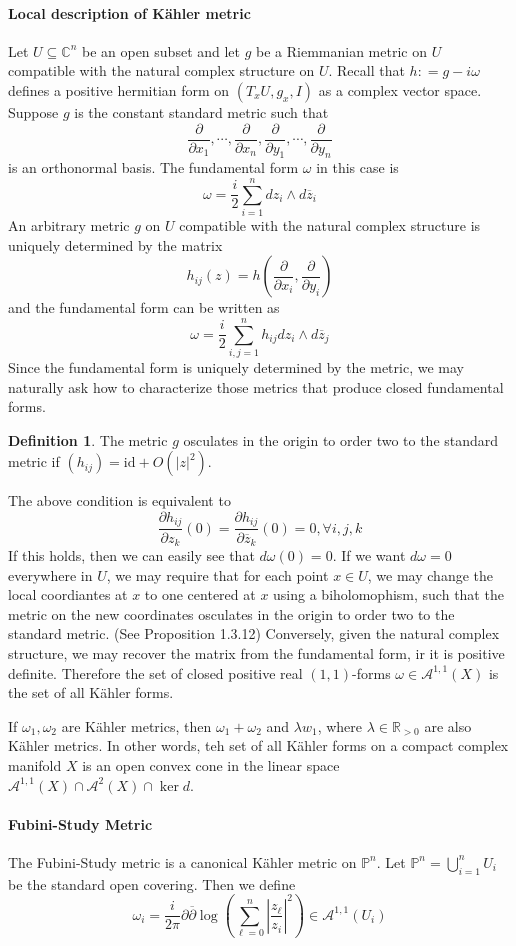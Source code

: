 \documentclass[12pt]{article}
\theoremstyle{plain}
\theoremstyle{definition}
\newtheorem{definition}[equation]{Definition}
\newcommand{\IC}{\mathbb{C}}
\newcommand{\IP}{\mathbb{P}}
\newcommand{\IR}{\mathbb{R}}
\newcommand\union{\bigcup}
\newcommand{\<}{\langle}
\renewcommand{\>}{\rangle}
\newcommand{\p}{\partial}
\newcommand{\w}{\omega}
\newcommand{\id}{\mathrm{id}}
\newcommand{\bz}{\overline{z}}
\newcommand{\bp}{\overline{\p}}
\newcommand{\sA}{\mathcal{A}}
\begin{document}
\paragraph{Local description of K{\"a}hler metric}
Let $U \subseteq \IC^n$ be an open subset and let $g$ be a Riemmanian metric on $U$ compatible with the natural complex structure on $U$. Recall that $h : = g - i \w$ defines a positive hermitian form on $(T_x U, g_x, I)$ as a complex vector space. Suppose $g$ is the constant standard metric such that 
$$ \frac{\p}{\p x_1}, \cdots, \frac{\p}{\p x_n}, \frac{\p}{\p y_1}, \cdots, \frac{\p}{\p y_n} $$
is an orthonormal basis. The fundamental form $\w$ in this case is 
$$ \w = \frac{i}{2} \sum_{i = 1}^n dz_i \wedge d \bz_i $$
An arbitrary metric $g$ on $U$ compatible with the natural complex structure is uniquely determined by the matrix 
$$ h_{ij}(z) = h(\frac{\p}{\p x_i}, \frac{\p}{\p y_i}) $$
and the fundamental form can be written as 
$$ \w = \frac{i}{2} \sum_{i, j = 1}^n h_{ij} dz_i \wedge d\bz_j $$
Since the fundamental form is uniquely determined by the metric, we may naturally ask how to characterize those metrics that produce closed fundamental forms. 
\begin{definition}
The metric $g$ osculates in the origin to order two to the standard metric if $(h_{ij}) = \id + O(|z|^2)$. 
\end{definition}
The above condition is equivalent to 
$$ \frac{\p h_{ij}}{\p z_k}(0) = \frac{\p h_{ij}}{\p \bz_k}(0) = 0, \forall i, j, k $$
If this holds, then we can easily see that $d \w (0) = 0$. If we want $d \w = 0$ everywhere in $U$, we may require that for each point $x \in U$, we may change the local coordiantes at $x$ to one centered at $x$ using a biholomophism, such that the metric on the new coordinates osculates in the origin to order two to the standard metric. (See Proposition 1.3.12)
Conversely, given the natural complex structure, we may recover the matrix from the fundamental form, ir it is positive definite. Therefore the set of closed positive real $(1, 1)$-forms $\w \in \sA^{1, 1}(X)$ is the set of all K{\"a}hler forms. 

If $\w_1, \w_2$ are K{\"a}hler metrics, then $\w_1 + \w_2$ and $\lambda w_1$, where $\lambda \in \IR_{> 0}$ are also K{\"a}hler metrics. In other words, teh set of all K{\"a}hler forms on a compact complex manifold $X$ is an open convex cone in the linear space $\sA^{1, 1}(X) \cap \sA^2(X) \cap \ker d$. 


\paragraph{Fubini-Study Metric}
The Fubini-Study metric is a canonical K{\"a}hler metric on $\IP^n$. Let $\IP^n = \union_{i = 1}^n U_i$ be the standard open covering. Then we define 
$$ \w_i = \frac{i}{2 \pi} \p \bp \log(\sum_{\ell = 0}^n |\frac{z_\ell}{z_i}|^2) \in \sA^{1, 1}(U_i) $$
\end{document}
